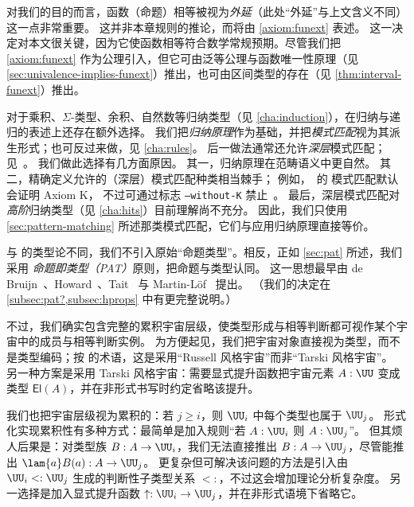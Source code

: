 对我们的目的而言，函数（命题）相等被视为\emph{外延}（此处“外延”与上文含义不同）这一点非常重要。
这并非本章规则的推论，而将由 \cref{axiom:funext} 表述。
%
这一决定对本文很关键，因为它使函数相等符合数学常规预期。尽管我们把 \cref{axiom:funext} 作为公理引入，但它可由泛等公理与函数唯一性原理（见 \cref{sec:univalence-implies-funext}）推出，也可由区间类型的存在（见 \cref{thm:interval-funext}）推出。

对于乘积、$\Sigma$-类型、余积、自然数等归纳类型（见 \cref{cha:induction}），在归纳与递归的表述上还存在额外选择。
%
我们把\emph{归纳原理}作为基础，并把\emph{模式匹配}视为其派生形式；也可反过来做，见 \cref{cha:rules}。
后一做法通常还允许\emph{深层}模式匹配；见~\cite{Coquand92Pattern}。
我们做此选择有几方面原因。
其一，归纳原理在范畴语义中更自然。
其二，精确定义允许的（深层）模式匹配种类相当棘手；
例如，\Agda\ 的
%
模式匹配默认会证明 Axiom K，
%
不过可通过标志 \texttt{--without-K} 禁止~\cite{CDP14}。
最后，深层模式匹配对\emph{高阶}归纳类型（见 \cref{cha:hits}）目前理解尚不充分。
因此，我们只使用 \cref{sec:pattern-matching} 所述那类模式匹配，它们与应用归纳原理直接等价。

%
与 \Coq 的类型论不同，我们不引入原始“命题类型”。相反，正如 \cref{sec:pat} 所述，我们采用
\emph{命题即类型（PAT）}原则，把命题与类型认同。
这一思想最早由 de Bruijn~\cite{deBruijn-1973}、Howard~\cite{howard:pat}、Tait~\cite{Tait-1968} 与 Martin-L\"{o}f~\cite{Martin-Lof-1972} 提出。
（我们的决定在 \cref{subsec:pat?,subsec:hprops} 中有更完整说明。）

不过，我们确实包含完整的累积宇宙层级，使类型形成与相等判断都可视作某个宇宙中的成员与相等判断实例。
为方便起见，我们把宇宙对象直接视为类型，而不是类型编码；按 \cite{martin-lof:bibliopolis} 的术语，这是采用“Russell 风格宇宙”而非“Tarski 风格宇宙”。
%
%
另一种方案是采用 Tarski 风格宇宙：需要显式提升函数把宇宙元素 $A:\UU$ 变成类型 $\mathsf{El}(A)$，并在非形式书写时约定省略该提升。

我们也把宇宙层级视为累积的：若 $j\ge i$，则 $\UU_i$ 中每个类型也属于 $\UU_j$。
形式化实现累积性有多种方式：最简单是加入规则“若 $A:\UU_i$ 则 $A:\UU_j$”。
但其烦人后果是：对类型族 $B:A\to \UU_i$，我们无法直接推出 $B:A\to\UU_j$，尽管能推出 $\lam{a} B(a) : A\to\UU_j$。
更复杂但可解决该问题的方法是引入由 $\UU_i<:\UU_j$ 生成的判断性子类型关系 $<:$，不过这会增加理论分析复杂度。
另一选择是加入显式提升函数 $\uparrow : \UU_i \to \UU_j$，并在非形式语境下省略它。


